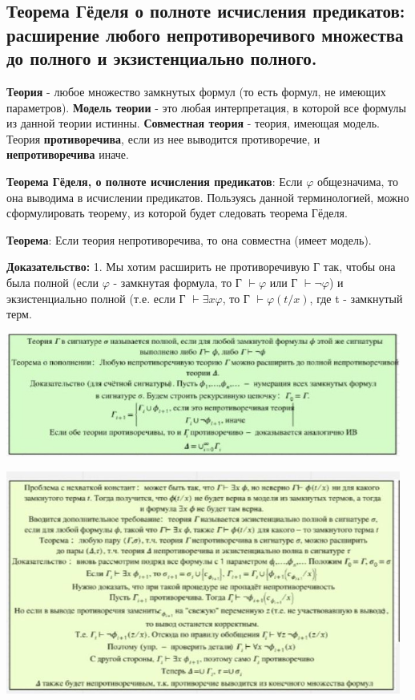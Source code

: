 \subsection{Теорема Гёделя о полноте исчисления предикатов: расширение любого непротиворечивого множества до полного и экзистенциально полного.}

\textbf{Теория} - любое множество замкнутых формул (то есть формул, не имеющих параметров). \textbf{Модель теории} - это любая интерпретация, в которой все формулы из данной теории истинны. \textbf{Совместная теория} - теория, имеющая модель. Теория \textbf{противоречива}, если из нее выводится противоречие, и \textbf{непротиворечива} иначе.

\par
\textbf{Теорема Гёделя, о полноте исчисления предикатов}:
Если $\varphi$ общезначима, то она выводима в исчислении предикатов.
Пользуясь данной терминологией, можно сформулировать теорему, из которой будет следовать теорема Гёделя.

\textbf{Теорема}: Если теория непротиворечива, то она совместна (имеет модель).

\textbf{Доказательство:} 1. Мы хотим расширить не противоречивую Г так, чтобы она была полной (если $\varphi$ - замкнутая формула, то Г $ \vdash \varphi$ или  Г $ \vdash \neg \varphi$) и экзистенциально полной (т.е. если Г $ \vdash \exists x \varphi$, то Г $ \vdash \varphi(t/x)$, где t - замкнутый терм.

\includegraphics[width=13cm]{images/1.5_m1}

\includegraphics[width=13cm]{images/1.5_m2}

